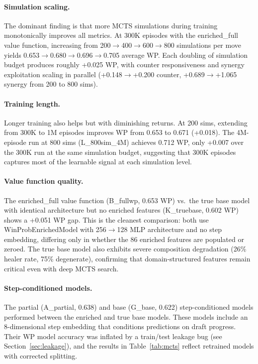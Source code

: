 \documentclass[journal]{IEEEtran}
\begin{document}
\paragraph{Simulation scaling.} The dominant finding is that more MCTS simulations during training monotonically improves all metrics. At 300K episodes with the enriched\_full value function, increasing from 200$\to$400$\to$600$\to$800 simulations per move yields 0.653$\to$0.680$\to$0.696$\to$0.705 average WP. Each doubling of simulation budget produces roughly +0.025 WP, with counter responsiveness and synergy exploitation scaling in parallel (+0.148$\to$+0.200 counter, +0.689$\to$+1.065 synergy from 200 to 800 sims).

\paragraph{Training length.} Longer training also helps but with diminishing returns. At 200 sims, extending from 300K to 1M episodes improves WP from 0.653 to 0.671 (+0.018). The 4M-episode run at 800 sims (L\_800sim\_4M) achieves 0.712 WP, only +0.007 over the 300K run at the same simulation budget, suggesting that 300K episodes captures most of the learnable signal at each simulation level.

\paragraph{Value function quality.} The enriched\_full value function (B\_fullwp, 0.653 WP) vs.\ the true base model with identical architecture but no enriched features (K\_truebase, 0.602 WP) shows a +0.051 WP gap. This is the cleanest comparison: both use WinProbEnrichedModel with 256$\to$128 MLP architecture and no step embedding, differing only in whether the 86 enriched features are populated or zeroed. The true base model also exhibits severe composition degradation (26\% healer rate, 75\% degenerate), confirming that domain-structured features remain critical even with deep MCTS search.

\paragraph{Step-conditioned models.} The partial (A\_partial, 0.638) and base (G\_base, 0.622) step-conditioned models performed between the enriched and true base models. These models include an 8-dimensional step embedding that conditions predictions on draft progress. Their WP model accuracy was inflated by a train/test leakage bug (see Section~\ref{sec:leakage}), and the results in Table~\ref{tab:mcts} reflect retrained models with corrected splitting.
\end{document}
